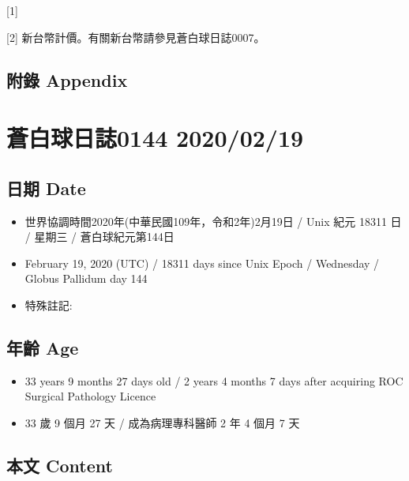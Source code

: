 \documentclass[
]{article}
\providecommand{\tightlist}{%
  \setlength{\itemsep}{0pt}\setlength{\parskip}{0pt}}
\begin{document}
{[}1{]}

{[}2{]} 新台幣計價。有關新台幣請參見蒼白球日誌0007。

\hypertarget{ux9644ux9304-appendix-79}{%
\subsection{附錄 Appendix}\label{ux9644ux9304-appendix-79}}

\hypertarget{ux84bcux767dux7403ux65e5ux8a8c0144-20200219}{%
\section{蒼白球日誌0144
2020/02/19}\label{ux84bcux767dux7403ux65e5ux8a8c0144-20200219}}

\hypertarget{ux65e5ux671f-date-80}{%
\subsection{日期 Date}\label{ux65e5ux671f-date-80}}

\begin{itemize}
\tightlist
\item
  世界協調時間2020年(中華民國109年，令和2年)2月19日 / Unix 紀元 18311 日
  / 星期三 / 蒼白球紀元第144日
\item
  February 19, 2020 (UTC) / 18311 days since Unix Epoch / Wednesday /
  Globus Pallidum day 144
\item
  特殊註記:
\end{itemize}

\hypertarget{ux5e74ux9f61-age-80}{%
\subsection{年齡 Age}\label{ux5e74ux9f61-age-80}}

\begin{itemize}
\tightlist
\item
  33 years 9 months 27 days old / 2 years 4 months 7 days after
  acquiring ROC Surgical Pathology Licence
\item
  33 歲 9 個月 27 天 / 成為病理專科醫師 2 年 4 個月 7 天
\end{itemize}

\hypertarget{ux672cux6587-content-80}{%
\subsection{本文 Content}\label{ux672cux6587-content-80}}
\end{document}
